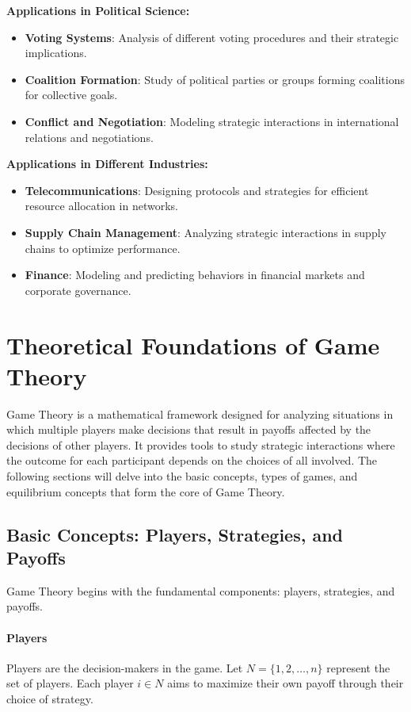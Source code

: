 \documentclass[12pt]{book} %
\begin{document}
\textbf{Applications in Political Science:}

\begin{itemize}
    \item \textbf{Voting Systems}: Analysis of different voting procedures and their strategic implications.
    \item \textbf{Coalition Formation}: Study of political parties or groups forming coalitions for collective goals.
    \item \textbf{Conflict and Negotiation}: Modeling strategic interactions in international relations and negotiations.
\end{itemize}

\textbf{Applications in Different Industries:}

\begin{itemize}
    \item \textbf{Telecommunications}: Designing protocols and strategies for efficient resource allocation in networks.
    \item \textbf{Supply Chain Management}: Analyzing strategic interactions in supply chains to optimize performance.
    \item \textbf{Finance}: Modeling and predicting behaviors in financial markets and corporate governance.
\end{itemize}


\section{Theoretical Foundations of Game Theory}

Game Theory is a mathematical framework designed for analyzing situations in which multiple players make decisions that result in payoffs affected by the decisions of other players. It provides tools to study strategic interactions where the outcome for each participant depends on the choices of all involved. The following sections will delve into the basic concepts, types of games, and equilibrium concepts that form the core of Game Theory.

\subsection{Basic Concepts: Players, Strategies, and Payoffs}

Game Theory begins with the fundamental components: players, strategies, and payoffs.

\paragraph{Players}
Players are the decision-makers in the game. Let \( N = \{1, 2, \ldots, n\} \) represent the set of players. Each player \( i \in N \) aims to maximize their own payoff through their choice of strategy.
\end{document}
